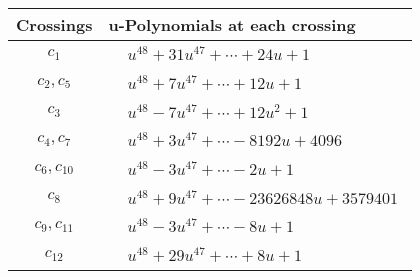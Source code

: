 \documentclass[1p]{elsarticle_modified}
\theoremstyle{definition}
\begin{document}
\begin{tabular}{m{50pt}|m{274pt}}
Crossings & \hspace{64pt}u-Polynomials at each crossing \\
\hline $$\begin{aligned}c_{1}\end{aligned}$$&$\begin{aligned}
&u^{48}+31 u^{47}+\cdots+24 u+1
\end{aligned}$\\
\hline $$\begin{aligned}c_{2},c_{5}\end{aligned}$$&$\begin{aligned}
&u^{48}+7 u^{47}+\cdots+12 u+1
\end{aligned}$\\
\hline $$\begin{aligned}c_{3}\end{aligned}$$&$\begin{aligned}
&u^{48}-7 u^{47}+\cdots+12 u^2+1
\end{aligned}$\\
\hline $$\begin{aligned}c_{4},c_{7}\end{aligned}$$&$\begin{aligned}
&u^{48}+3 u^{47}+\cdots-8192 u+4096
\end{aligned}$\\
\hline $$\begin{aligned}c_{6},c_{10}\end{aligned}$$&$\begin{aligned}
&u^{48}-3 u^{47}+\cdots-2 u+1
\end{aligned}$\\
\hline $$\begin{aligned}c_{8}\end{aligned}$$&$\begin{aligned}
&u^{48}+9 u^{47}+\cdots-23626848 u+3579401
\end{aligned}$\\
\hline $$\begin{aligned}c_{9},c_{11}\end{aligned}$$&$\begin{aligned}
&u^{48}-3 u^{47}+\cdots-8 u+1
\end{aligned}$\\
\hline $$\begin{aligned}c_{12}\end{aligned}$$&$\begin{aligned}
&u^{48}+29 u^{47}+\cdots+8 u+1
\end{aligned}$\\
\hline
\end{tabular}\\~\\
\end{document}
